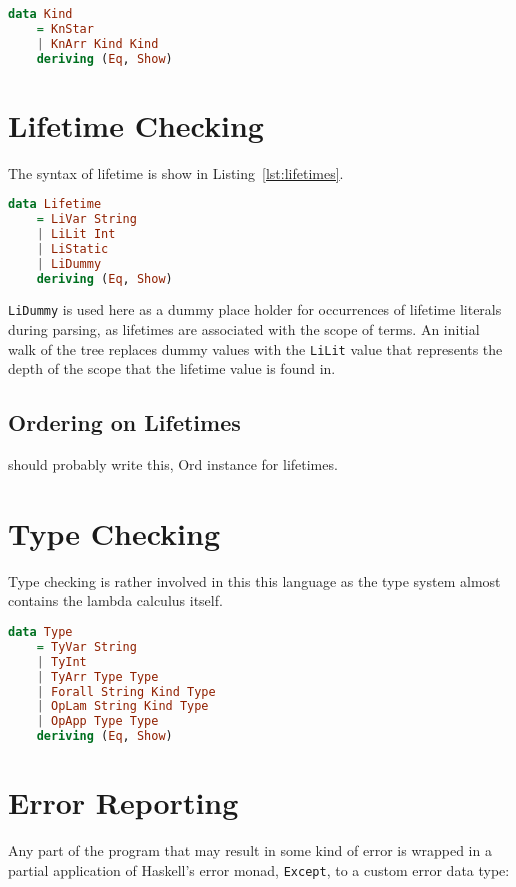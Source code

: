 \begin{lstlisting}[caption=Haskell representation of Kinds., language=Haskell, label={lst:kinds}]
data Kind
    = KnStar
    | KnArr Kind Kind
    deriving (Eq, Show)
\end{lstlisting}

\section{Lifetime Checking}
The syntax of lifetime is show in Listing~\ref{lst:lifetimes}. 

\begin{lstlisting}[caption=Haskell representation of Lifetimes.., language=Haskell, label={lst:lifetimes}]
data Lifetime 
    = LiVar String
    | LiLit Int
    | LiStatic
    | LiDummy
    deriving (Eq, Show)
\end{lstlisting}

\lstinline{LiDummy} is used here as a dummy place holder for occurrences of
lifetime literals during parsing, as lifetimes are associated with the scope of
terms. An initial walk of the tree replaces dummy values with the
\lstinline{LiLit} value that represents the depth of the scope that the
lifetime value is found in.

\subsection{Ordering on Lifetimes}
should probably write this, Ord instance for lifetimes.

\section{Type Checking}
Type checking is rather involved in this this language as the type system
almost contains the lambda calculus itself.

\begin{lstlisting}[caption=Haskell representation of Types., language=Haskell, label={lst:types}]
data Type
    = TyVar String
    | TyInt
    | TyArr Type Type
    | Forall String Kind Type
    | OpLam String Kind Type
    | OpApp Type Type
    deriving (Eq, Show)
\end{lstlisting}

\section{Error Reporting}
Any part of the program that may result in some kind of error is wrapped in
a partial application of Haskell's error monad, \lstinline{Except}, to a custom
error data type:

